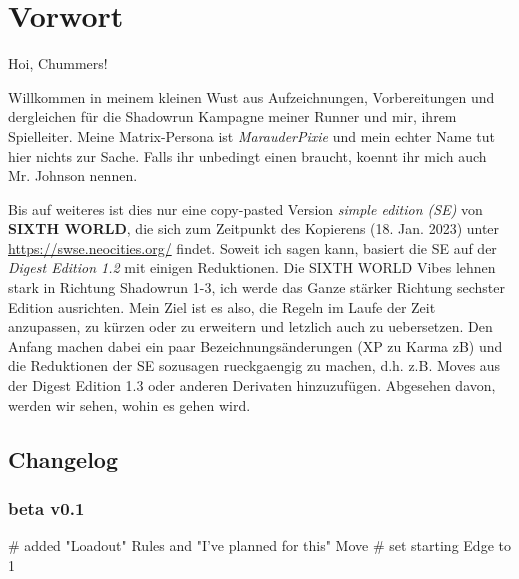 \chapter{Vorwort}

Hoi, Chummers!

Willkommen in meinem kleinen Wust aus Aufzeichnungen, Vorbereitungen und dergleichen für die Shadowrun Kampagne meiner Runner und mir, ihrem Spielleiter. Meine Matrix-Persona ist \textit{MarauderPixie} und mein echter Name tut hier nichts zur Sache. Falls ihr unbedingt einen braucht, koennt ihr mich auch Mr. Johnson nennen.

Bis auf weiteres ist dies nur eine copy-pasted Version \textit{simple edition (SE)} von \textbf{SIXTH WORLD}, die sich zum Zeitpunkt des Kopierens (18. Jan. 2023) unter \url{https://swse.neocities.org/} findet. Soweit ich sagen kann, basiert die SE auf der \textit{Digest Edition 1.2} mit einigen Reduktionen. Die SIXTH WORLD Vibes lehnen stark in Richtung Shadowrun 1-3, ich werde das Ganze stärker Richtung sechster Edition ausrichten. Mein Ziel ist es also, die Regeln im Laufe der Zeit anzupassen, zu kürzen oder zu erweitern und letzlich auch zu uebersetzen. Den Anfang machen dabei ein paar Bezeichnungsänderungen (XP zu Karma zB) und die Reduktionen der SE sozusagen rueckgaengig zu machen, d.h. z.B. Moves aus der Digest Edition 1.3 oder anderen Derivaten hinzuzufügen. Abgesehen davon, werden wir sehen, wohin es gehen wird. 

\section{Changelog}

\subsection*{beta v0.1}
\begin{easylist}
    # added "Loadout" Rules and "I've planned for this" Move
    # set starting Edge to 1
\end{easylist}

